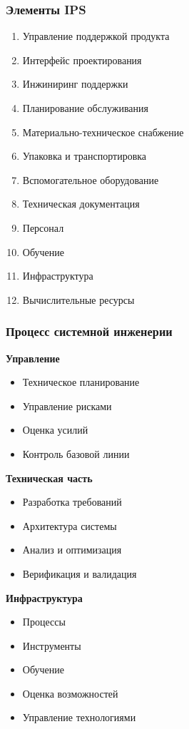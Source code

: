 \documentclass[14pt,a4paper]{extarticle}
\begin{document}
\subsubsection{Элементы IPS}

\begin{enumerate}
\item Управление поддержкой продукта
\item Интерфейс проектирования
\item Инжиниринг поддержки
\item Планирование обслуживания
\item Материально-техническое снабжение
\item Упаковка и транспортировка
\item Вспомогательное оборудование
\item Техническая документация
\item Персонал
\item Обучение
\item Инфраструктура
\item Вычислительные ресурсы
\end{enumerate}

\subsubsection{Процесс системной инженерии}

\textbf{Управление}
\begin{itemize}
\item Техническое планирование
\item Управление рисками
\item Оценка усилий
\item Контроль базовой линии
\end{itemize}

\textbf{Техническая часть}
\begin{itemize}
\item Разработка требований
\item Архитектура системы
\item Анализ и оптимизация
\item Верификация и валидация
\end{itemize}

\textbf{Инфраструктура}
\begin{itemize}
\item Процессы
\item Инструменты
\item Обучение
\item Оценка возможностей
\item Управление технологиями
\end{itemize}
\end{document}
